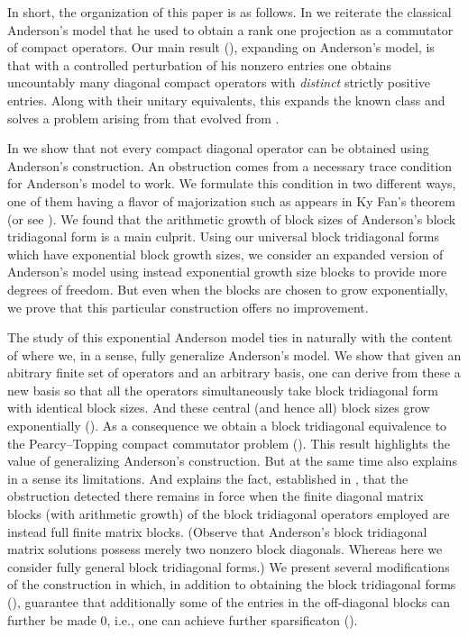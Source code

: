 \documentclass[10pt,reqno]{amsart}
\theoremstyle{remark}
\numberwithin{equation}{section}
\begin{document}
In short, the organization of this paper is as follows.
In  we reiterate the classical Anderson's model that he used to obtain a rank one projection as a commutator of compact operators.
Our main result (), expanding on Anderson's model, is that with a controlled perturbation of his nonzero entries one obtains uncountably many diagonal compact operators  with \emph{distinct} strictly positive entries.
Along with their unitary equivalents, this expands the known class and solves a problem arising from \cite{BPW-2014-VLOT} that evolved from \cite{And-1977-JRAM,DMR,Pat-2012}.

In  we show that not every compact diagonal operator can be obtained using Anderson's construction.
An obstruction comes from a necessary trace condition for Anderson's model to work.
We formulate this condition in two different ways, one of them having a flavor of majorization such as appears in Ky Fan's theorem \cite{Fan-1951-PNASUSA} (or see \cite[Lemma 4.1]{GK-1969-ITTTOLNO}).
We found that
the arithmetic growth of block sizes of Anderson's block tridiagonal form is a main culprit.
Using our universal block tridiagonal forms which have exponential block growth sizes, we consider an expanded version of Anderson's model using instead exponential growth size blocks to provide more degrees of freedom.
But even when the blocks are chosen to grow exponentially, we prove that this particular construction offers no improvement.

The study of this exponential Anderson model ties in naturally with the content of  where we, in a sense, fully generalize Anderson's model.
We show that given an abitrary finite set of operators and an arbitrary basis, one can derive from these a new basis so that all the operators simultaneously take block tridiagonal form with identical block sizes.
And these central (and hence all) block sizes grow exponentially ().
As a consequence we obtain a block tridiagonal equivalence to the Pearcy--Topping compact commutator problem ().
This result highlights the value of generalizing Anderson's construction.
But at the same time also explains in a sense its limitations.
And explains the fact, established in , that the obstruction detected there remains in force when the finite diagonal matrix blocks (with arithmetic growth) of the block tridiagonal operators employed are instead full finite matrix blocks.
(Observe that Anderson's block tridiagonal matrix solutions possess merely two nonzero block diagonals.
Whereas here we consider fully general block tridiagonal forms.)
We present several modifications of the construction in  which, in addition to obtaining the block tridiagonal forms (), guarantee that additionally some of the entries in the off-diagonal blocks can further be made 0, i.e., one can achieve further sparsificaton ().
\end{document}
